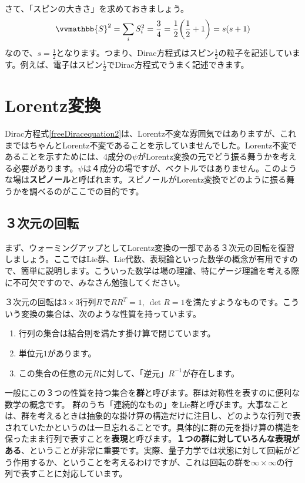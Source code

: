 \documentclass[report,paper=a4, fontsize=12pt, line_length=16cm, number_of_lines=33,dvipdfmx]{jlreq}
\numberwithin{equation}{chapter}
\newcommand{\strong}[1]{{\sffamily \bfseries #1}}
\newcommand{\Sb}{\vvmathbb{S}}
\begin{document}
さて、「スピンの大きさ」を求めておきましょう。
\begin{align}
  \Sb^2=\sum_{i}S_i^2=\frac{3}{4}=\frac{1}{2}\qty(\frac{1}{2}+1)=s(s+1)
\end{align}
なので、$s=\frac{1}{2}$となります。つまり、Dirac方程式はスピン$\frac{1}{2}$の粒子を記述しています。例えば、電子はスピン$\frac{1}{2}$でDirac方程式でうまく記述できます。

\section{Lorentz変換}
Dirac方程式\eqref{freeDiracequation2}は、Lorentz不変な雰囲気ではありますが、これまではちゃんとLorentz不変であることを示していませんでした。Lorentz不変であることを示すためには、4成分の$\psi$がLorentz変換の元でどう振る舞うかを考える必要があります。$\psi$は４成分の場ですが、ベクトルではありません。このような場は\strong{スピノール}と呼ばれます。スピノールがLorentz変換でどのように振る舞うかを調べるのがここでの目的です。

\subsection{３次元の回転}
まず、ウォーミングアップとしてLorentz変換の一部である３次元の回転を復習しましょう。ここではLie群、Lie代数、表現論といった数学の概念が有用ですので、簡単に説明します。こういった数学は場の理論、特にゲージ理論を考える際に不可欠ですので、みなさん勉強してください。

３次元の回転は$3\times 3$行列$R$で$RR^{T}=1,\ \det R=1$を満たすようなものです。こういう変換の集合は、次のような性質を持っています。
\begin{enumerate}
  \item 行列の集合は結合則を満たす掛け算で閉じています。
  \item 単位元$1$があります。
  \item この集合の任意の元$R$に対して、「逆元」$R^{-1}$が存在します。
\end{enumerate}
一般にこの３つの性質を持つ集合を\strong{群}と呼びます。群は対称性を表すのに便利な数学の概念です。
群のうち「連続的なもの」をLie群と呼びます。大事なことは、群を考えるときは抽象的な掛け算の構造だけに注目し、どのような行列で表されていたかというのは一旦忘れることです。具体的に群の元を掛け算の構造を保ったまま行列で表すことを\strong{表現}と呼びます。\strong{１つの群に対していろんな表現がある}、ということが非常に重要です。実際、量子力学では状態に対して回転がどう作用するか、ということを考えるわけですが、これは回転の群を$\infty\times\infty$の行列で表すことに対応しています。
\end{document}
